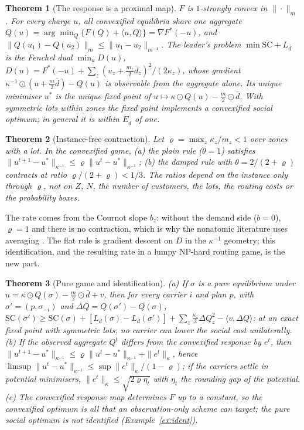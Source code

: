 \documentclass[preprint,12pt]{elsarticle}
\newtheorem{theorem}{Theorem}
\theoremstyle{definition}
\theoremstyle{remark}
\newcommand{\ip}[2]{\langle #1,#2\rangle}
\begin{document}
\begin{theorem}[The response is a proximal map]\label{thm:resolvent}
$F$ is $1$-strongly convex in $\|\cdot\|_m$. For every charge $u$, all convexified equilibria share one aggregate $Q(u)=\arg\min_Q\{F(Q)+\ip uQ\}=\nabla F^*(-u)$, and $\|Q(u_1)-Q(u_2)\|_m\le\|u_1-u_2\|_{m^{-1}}$. The leader's problem $\min\overline{\mathrm{SC}}+L_{\bar d}$ is the Fenchel dual $\min_uD(u)$, $D(u)=F^*(-u)+\sum_z(u_z+\tfrac{m_z}{2}\bar d_z)^2/(2\kappa_z)$, whose gradient $\kappa^{-1}\odot(u+\tfrac m2\bar d)-Q(u)$ is observable from the aggregate alone. Its unique minimiser $u^*$ is the unique fixed point of $u\mapsto\kappa\odot Q(u)-\tfrac m2\odot\bar d$. With symmetric lots within zones the fixed point implements a convexified social optimum; in general it is within $E_{\bar d}$ of one.
\end{theorem}

\begin{theorem}[Instance-free contraction]\label{thm:rate}
Let $\varrho=\max_z\kappa_z/m_z<1$ over zones with a lot. In the convexified game, (a) the plain rule ($\theta=1$) satisfies $\|u^{t+1}-u^*\|_{\kappa^{-1}}\le\varrho\|u^t-u^*\|_{\kappa^{-1}}$; (b) the damped rule with $\theta=2/(2+\varrho)$ contracts at ratio $\varrho/(2+\varrho)<1/3$. The ratios depend on the instance only through $\varrho$, not on $Z$, $N$, the number of customers, the lots, the routing costs or the probability boxes.
\end{theorem}
The rate comes from the Cournot slope $b_z$: without the demand side ($b=0$), $\varrho=1$ and there is no contraction, which is why the nonatomic literature uses averaging \citep{Yang2004}. The flat rule is gradient descent on $D$ in the $\kappa^{-1}$ geometry; this identification, and the resulting rate in a lumpy NP-hard routing game, is the new part.

\begin{theorem}[Pure game and identification]\label{thm:pure}
(a) If $\sigma$ is a pure equilibrium under $u=\kappa\odot Q(\sigma)-\tfrac m2\odot\bar d+v$, then for every carrier $i$ and plan $p$, with $\sigma'=(p,\sigma_{-i})$ and $\Delta Q=Q(\sigma')-Q(\sigma)$, $\mathrm{SC}(\sigma')\ge\mathrm{SC}(\sigma)+[L_{\bar d}(\sigma)-L_{\bar d}(\sigma')]+\sum_z\tfrac{\kappa_z}{2}\Delta Q_z^2-\ip v{\Delta Q}$: at an exact fixed point with symmetric lots, no carrier can lower the social cost unilaterally. (b) If the observed aggregate $Q^t$ differs from the convexified response by $e^t$, then $\|u^{t+1}-u^*\|_{\kappa^{-1}}\le\varrho\|u^t-u^*\|_{\kappa^{-1}}+\|e^t\|_\kappa$, hence $\limsup\|u^t-u^*\|_{\kappa^{-1}}\le\sup\|e^t\|_\kappa/(1-\varrho)$; if the carriers settle in potential minimisers, $\|e^t\|_\kappa\le\sqrt{2\varrho\eta_t}$ with $\eta_t$ the rounding gap of the potential. (c) The convexified response map determines $F$ up to a constant, so the convexified optimum is all that an observation-only scheme can target; the pure social optimum is not identified (Example~\ref{ex:ident}).
\end{theorem}
\end{document}
